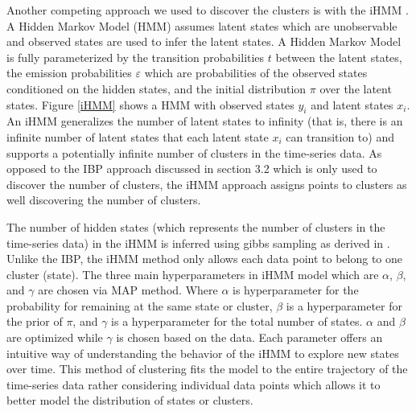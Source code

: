 \documentclass{article}
\begin{document}
Another competing approach we used to discover the clusters is with the iHMM \cite{BeamiHMM}. A Hidden Markov Model (HMM) assumes latent states which are unobservable and observed states are used to infer the latent states. A Hidden Markov Model is fully parameterized by the transition probabilities $t$ between the latent states, the emission probabilities $\varepsilon$ which are probabilities of the observed states conditioned on the hidden states, and the initial distribution $\pi$ over the latent states. Figure \ref{iHMM} shows a HMM with observed states $y_{i}$ and latent states $x_{i}$. An iHMM generalizes the number of latent states to infinity (that is, there is an infinite number of latent states that each latent state $x_{i}$ can transition to) and supports a potentially infinite number of clusters in the time-series data. As opposed to the IBP approach discussed in section 3.2 which is only used to discover the number of clusters, the iHMM approach assigns points to clusters as well discovering the number of clusters. 

The number of hidden states (which represents the number of clusters in the time-series data) in the iHMM is inferred using gibbs sampling as derived in \cite{iHMMBeal}. Unlike the IBP, the iHMM method only allows each data point to belong to one cluster (state). The three main hyperparameters in iHMM model which are $\alpha$, $\beta$, and $\gamma$ are chosen via MAP method. Where $\alpha$ is hyperparameter for the probability for remaining at the same state or cluster, $\beta$ is a hyperparameter for the prior of $\pi$, and $\gamma$ is a hyperparameter for the total number of states. $\alpha$ and $\beta$ are optimized while $\gamma$ is chosen based on the data. Each parameter offers an intuitive way of understanding the behavior of the iHMM to explore new states over time. This method of clustering fits the model to the entire trajectory of the time-series data rather considering individual data points which allows it to better model the distribution of states or clusters.
\end{document}
